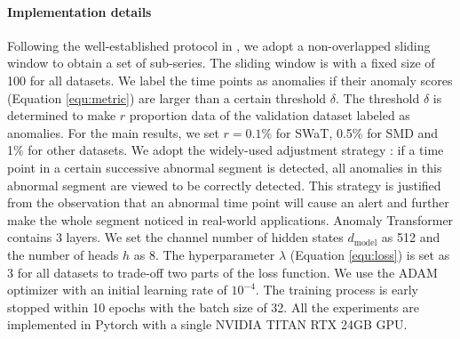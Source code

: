 \documentclass{article} %
\begin{document}
\paragraph{Implementation details} 
Following the well-established protocol in \cite{DBLP:conf/nips/ShenLK20}, we adopt a non-overlapped sliding window to obtain a set of sub-series. The sliding window is with a fixed size of 100 for all datasets.
We label the time points as anomalies if their anomaly scores (Equation \ref{equ:metric}) are larger than a certain threshold $\delta$. 
The threshold $\delta$ is determined to make $r$ proportion data of the validation dataset labeled as anomalies. For the main results, we set $r=0.1\%$ for SWaT, 0.5\% for SMD and 1\% for other datasets.
We adopt the widely-used adjustment strategy \citep{Xu2018UnsupervisedAD,Su2019RobustAD,DBLP:conf/nips/ShenLK20}: if a time point in a certain successive abnormal segment is detected, all anomalies in this abnormal segment are viewed to be correctly detected. This strategy is justified from the observation that an abnormal time point will cause an alert and further make the whole segment noticed in real-world applications.
Anomaly Transformer contains 3 layers. We set the channel number of hidden states $d_{\text{model}}$ as 512 and the number of heads $h$ as 8. The hyperparameter $\lambda$ (Equation \ref{equ:loss}) is set as 3 for all datasets to trade-off two parts of the loss function. We use the ADAM \citep{DBLP:journals/corr/KingmaB14} optimizer with an initial learning rate of $10^{-4}$. The training process is early stopped within 10 epochs with the batch size of 32. All the experiments are implemented in Pytorch \citep{Paszke2019PyTorchAI} with a single NVIDIA TITAN RTX 24GB GPU. %

\vspace{-5pt}
\end{document}
